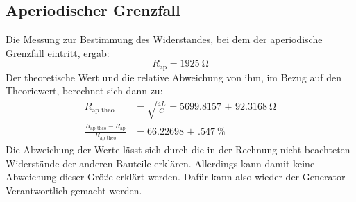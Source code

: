 \subsection{Aperiodischer Grenzfall}
\noindent
Die Messung zur Bestimmung des Widerstandes, bei dem der aperiodische Grenzfall eintritt, ergab:
\begin{equation}
    R_\text{ap}=\SI[]{1925}[]{\ohm} \nonumber
\end{equation}
Der theoretische Wert und die relative Abweichung von ihm, im Bezug auf den Theoriewert, berechnet sich dann zu:
\begin{align*}
    R_\text{ap theo}&= \sqrt{\frac{4L}{C}}=\SI{5699.8157(923168)}{\ohm}\\
    \frac{R_\text{ap theo}-R_\text{ap}}{R_\text{ap theo}}&=\SI{66.22698(54700)}{\percent}
\end{align*}
Die Abweichung der Werte lässt sich durch die in der Rechnung nicht beachteten Widerstände der anderen Bauteile erklären. 
Allerdings kann damit keine Abweichung dieser Größe erklärt werden. Dafür kann also wieder der Generator Verantwortlich gemacht werden.


